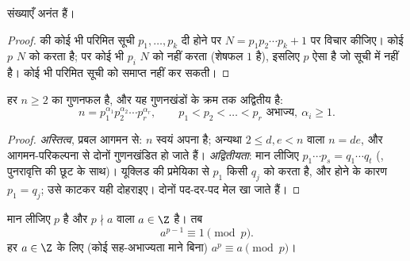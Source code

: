 \begin{theorem}[यूक्लिड]\label{thm:g12:arith:infiniteprimes}
 संख्याएँ अनंत हैं।
\end{theorem}

\begin{proof}
 की कोई भी परिमित सूची $p_1, \dots, p_k$ दी होने पर $N = p_1 p_2 \cdots p_k + 1$ पर विचार कीजिए। कोई
 $p$ $N$ को  करता है; पर कोई भी $p_i$ $N$ को  नहीं
करता (शेषफल $1$ है), इसलिए $p$ ऐसा  है जो सूची में नहीं है। कोई भी
परिमित सूची  को समाप्त नहीं कर सकती।
\end{proof}

\begin{theorem}[अंकगणित की मूल प्रमेय]\label{thm:g12:arith:fta}
हर  $n \geq 2$  का गुणनफल है, और यह  गुणनखंडों के क्रम तक
अद्वितीय है:
\[
n = p_1^{\alpha_1} p_2^{\alpha_2} \cdots p_r^{\alpha_r},
\qquad p_1 < p_2 < \dots < p_r \text{ अभाज्य},\ \alpha_i \geq 1 .
\]
\end{theorem}

\begin{proof}
\emph{अस्तित्व}, प्रबल आगमन से:  $n$ स्वयं अपना  है; अन्यथा
$2 \leq d, e < n$ वाला $n = de$, और आगमन-परिकल्पना से दोनों गुणनखंडित हो जाते हैं।
\emph{अद्वितीयता}: मान लीजिए $p_1\cdots p_s = q_1 \cdots q_t$ (, पुनरावृत्ति की छूट के साथ)।
यूक्लिड की प्रमेयिका से $p_1$ किसी $q_j$ को  करता है, और  होने
के कारण $p_1 = q_j$; उसे काटकर यही दोहराइए। दोनों  पद-दर-पद मेल खा जाते
हैं।
\end{proof}

\begin{theorem}[फ़र्मा की लघु प्रमेय]\label{thm:g12:arith:fermat}
मान लीजिए $p$  है और $p \nmid a$ वाला $a \in \Z$ है। तब
\[
a^{p-1} \equiv 1 \pmod p .
\]
हर $a \in \Z$ के लिए (कोई सह-अभाज्यता माने बिना) $a^p \equiv a \pmod p$।
\end{theorem}

